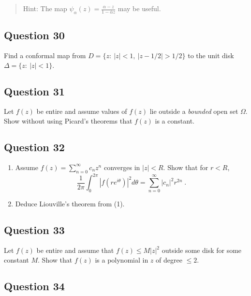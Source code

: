 \documentclass[12pt]{article}
\begin{document}
\begin{quote}
Hint: The map
\(\displaystyle{\psi_{\alpha}(z)=\frac{\alpha-z}{1-\bar{\alpha}z}}\) may
be useful.
\end{quote}

\hypertarget{question-30-2}{%
\subsection{Question 30}\label{question-30-2}}

Find a conformal map from \(D = \{z :\  |z| < 1,\ |z - 1/2| > 1/2\}\) to
the unit disk \(\Delta=\{z: \ |z|<1\}\).

\hypertarget{question-31-2}{%
\subsection{Question 31}\label{question-31-2}}

Let \(f(z)\) be entire and assume values of \(f(z)\) lie outside a
\emph{bounded} open set \(\Omega\). Show without using Picard's theorems
that \(f(z)\) is a constant.

\hypertarget{question-32-2}{%
\subsection{Question 32}\label{question-32-2}}

\begin{enumerate}
\def\labelenumi{(\arabic{enumi})}
\item
  Assume \(\displaystyle f(z) = \sum_{n=0}^\infty c_n z^n\) converges in
  \(|z| < R\). Show that for \(r <R\),
  \[\frac{1}{2 \pi} \int_0^{2 \pi} |f(r e^{i \theta})|^2 d \theta
  = \sum_{n=0}^\infty |c_n|^2 r^{2n} \; .\]
\item
  Deduce Liouville's theorem from (1).
\end{enumerate}

\hypertarget{question-33-2}{%
\subsection{Question 33}\label{question-33-2}}

Let \(f(z)\) be entire and assume that \(f(z) \leq M |z|^2\) outside
some disk for some constant \(M\). Show that \(f(z)\) is a polynomial in
\(z\) of degree \(\leq 2\).

\hypertarget{question-34-2}{%
\subsection{Question 34}\label{question-34-2}}
\end{document}
